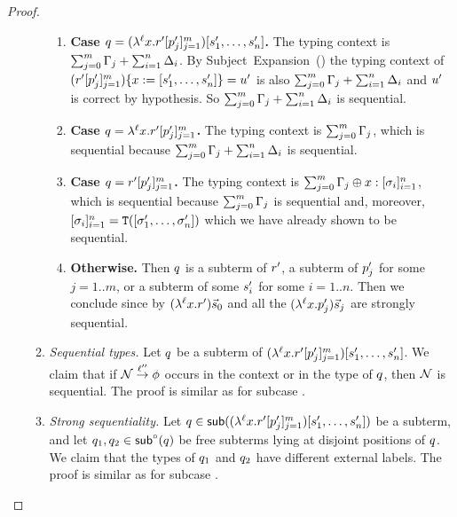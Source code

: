 \begin{proof}
\begin{enumerate}
\begin{enumerate}
    \begin{enumerate}
    \item {\bf Case $q = (\lambda^{\ell} x. r'[p'_j]_{j=1}^{m})[s'_1,\hdots,s'_n]$.}
      The typing context is $\sum_{j=0}^{m} \Gamma_j + \sum_{i=1}^n \Delta_i$.
      By Subject~Expansion~()
      the typing context of $(r'[p'_j]_{j=1}^{m})\{x := [s'_1,\hdots,s'_n]\} = u'$
      is also $\sum_{j=0}^{m} \Gamma_j + \sum_{i=1}^n \Delta_i$
      and $u'$ is correct by hypothesis.
      So $\sum_{j=0}^{m} \Gamma_j + \sum_{i=1}^n \Delta_i$ is sequential.
    \item {\bf Case $q = \lambda^{\ell} x. r'[p'_j]_{j=1}^{m}$.}
      The typing context is
      $\sum_{j=0}^{m} \Gamma_j$,
      which is sequential because $\sum_{j=0}^{m} \Gamma_j + \sum_{i=1}^n \Delta_i$ is sequential.
    \item {\bf Case $q = r'[p'_j]_{j=1}^{m}$.}
      The typing context is
      $\sum_{j=0}^{m} \Gamma_j \oplus x : [\sigma_i]_{i=1}^n$,
      which is sequential because $\sum_{j=0}^{m} \Gamma_j$ is sequential
      and, moreover, $[\sigma_i]_{i=1}^n = \mathtt{T}([\sigma'_1,\hdots,\sigma'_n])$
      which we have already shown to be sequential.
    \item {\bf Otherwise.}
      Then $q$ is a subterm of $r'$, a subterm of $p'_j$ for some $j=1..m$,
      or a subterm of some $s'_i$ for some $i=1..n$.
      Then we conclude since by \ih $(\lambda^{\ell} x. r')\vec{s}_0$
      and all the $(\lambda^{\ell} x. p'_j)\vec{s}_j$
      are strongly sequential.
    \end{enumerate}
  \item {\em Sequential types.}
    Let $q$ be a subterm of $(\lambda^{\ell} x. r'[p'_j]_{j=1}^{m})[s'_1,\hdots,s'_n]$.
    We claim that if $\mathcal{N} \overset{\ell''}{\to} \phi$ occurs in the context or in the type of $q$,
    then $\mathcal{N}$ is sequential.
    The proof is similar as for subcase \label{refinement_substitution_inverse__case_lambda_sequential_types}.
  \item {\em Strong sequentiality.}
    Let $q \in \mathsf{sub}((\lambda^{\ell} x. r'[p'_j]_{j=1}^{m})[s'_1,\hdots,s'_n])$
    be a subterm,
    and let $q_1,q_2 \in \mathsf{sub}^{\circ}(q)$ be free subterms lying at disjoint positions of $q$.
    We claim that the types of $q_1$ and $q_2$ have different external labels.
    The proof is similar as for subcase \label{refinement_substitution_inverse__case_lambda_strong_sequentiality}.
  \end{enumerate}
\end{enumerate}
\end{proof}

